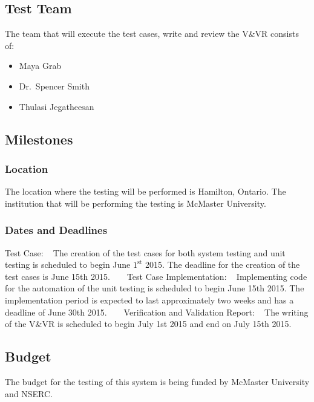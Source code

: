 \documentclass[12pt]{article}
\begin{document}
\subsection{Test Team} 
The team that will execute the test cases, write and review the V\&VR consists of:

\begin{itemize}
 \item Maya Grab 
 \item Dr.\ Spencer Smith
 \item Thulasi Jegatheesan 
\end{itemize}  

\subsection{Milestones}

\subsubsection{Location}
The location where the testing will be performed is Hamilton, Ontario. The institution that
will be performing the testing is McMaster University. 


\subsubsection{Dates and Deadlines}
Test Case:
~\newline
The creation of the test cases for both system testing and unit testing is 
scheduled to begin June $1^\text{st}$ 2015.
The deadline for the creation of the test cases is June 15th 2015. 
~\newline
~\newline
Test Case Implementation:
~\newline
Implementing code for the automation of the unit testing is scheduled to begin 
June 15th 2015. The implementation period
is expected to last approximately two weeks and has a deadline of June 30th 2015.
~\newline
~\newline
Verification and Validation Report:
~\newline
The writing of the V\&VR is scheduled to begin July 1st 2015 and end on July 15th 2015. 

\subsection{Budget}
The budget for the testing of this system is being funded by McMaster University and NSERC.
\end{document}
